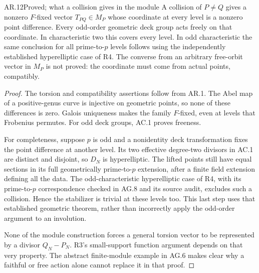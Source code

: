 \begin{claim}{AR.12}{Proved; what a collision gives in the module}
A collision of $P\ne Q$ gives a nonzero $F$-fixed vector
$T_{PQ}\in M_P$ whose coordinate at every level is a nonzero
point difference.  Every odd-order geometric deck group acts freely
on that coordinate.  In characteristic two this covers every level.
In odd characteristic the same conclusion for all prime-to-$p$
levels follows using the independently established hyperelliptic
case of R4.
The converse from an arbitrary free-orbit vector in $M_P$ is not
proved: the coordinate must come from actual points, compatibly.
\end{claim}
\begin{proof}
The torsion and compatibility assertions follow from AR.1.  The Abel
map of a positive-genus curve is injective on geometric points, so
none of these differences is zero.  Galois uniqueness makes the
family $F$-fixed, even at levels that Frobenius permutes.  For odd
deck groups, AC.1 proves freeness.

For completeness, suppose $p$ is odd and a nonidentity deck
transformation fixes the point difference at another level.  Its
two effective degree-two divisors in AC.1 are distinct and disjoint,
so $D_N$ is hyperelliptic.  The lifted points still have equal
sections in its full geometrically prime-to-$p$ extension, after a
finite field extension defining all the data.  The odd-characteristic
hyperelliptic case of R4, with its prime-to-$p$ correspondence checked
in AG.8 and its source audit, excludes such a collision.  Hence the
stabilizer is trivial at these levels too.  This last step uses
that established geometric theorem, rather than incorrectly apply
the odd-order argument to an involution.

None of the module construction forces a general torsion vector to
be represented by a divisor $Q_N-P_N$.  R3's small-support function
argument depends on that very property.  The abstract finite-module
example in AG.6 makes clear why a faithful or free action alone
cannot replace it in that proof.
\end{proof}

